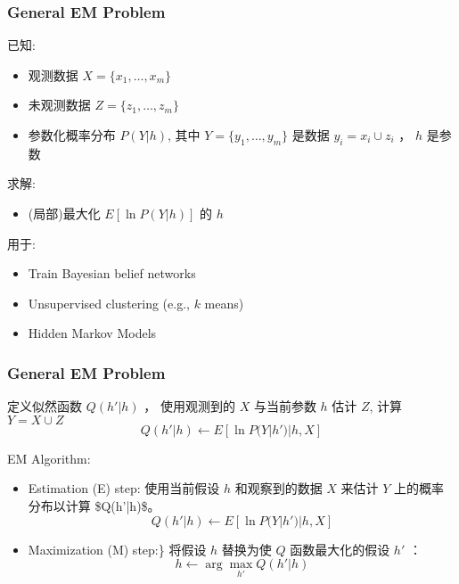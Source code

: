 \documentclass{beamer}
\begin{document}
\begin{frame}
\frametitle{General  EM Problem}
\label{sec-11-7}


已知:
\begin{itemize}
\item 观测数据 $X=\{x_1, \ldots, x_m\}$
\item 未观测数据 $Z=\{z_1, \dots, z_m\}$
\item 参数化概率分布 $P(Y|h)$, 其中  $Y=\{y_1, \dots, y_m\}$ 是数据 $y_i = x_i \cup z_i$ ，  $h$ 是参数
\end{itemize}

求解:
\begin{itemize}
\item (局部)最大化 $E[\ln P(Y|h)]$ 的 $h$
\end{itemize}


用于:
\begin{itemize}
\item Train Bayesian belief networks
\item Unsupervised clustering (e.g., $k$ means)
\item Hidden Markov Models
\end{itemize}
\end{frame}
\begin{frame}
\frametitle{General  EM Problem}
\label{sec-11-8}

定义似然函数 $Q(h' | h)$ ， 使用观测到的 $X$ 与当前参数 $h$ 估计 $Z$, 计算 $Y = X \cup Z$
$$Q(h' | h) \leftarrow E[ \ln P(Y | h') | h, X ]$$

EM Algorithm:

\begin{itemize}
\item Estimation (E) step: 
    使用当前假设 $h$ 和观察到的数据 $X$ 来估计 $Y$ 上的概率分布以计算 \$Q(h'|h)\$。
    $$Q(h' | h) \leftarrow E[ \ln P(Y | h') | h, X ]$$
\item Maximization (M) step:\} 
    将假设 $h$ 替换为使 $Q$ 函数最大化的假设 $h'$ ：
    $$h \leftarrow \arg \max_{h'}  Q(h' | h)$$
\end{itemize}
\end{frame}
\end{document}
